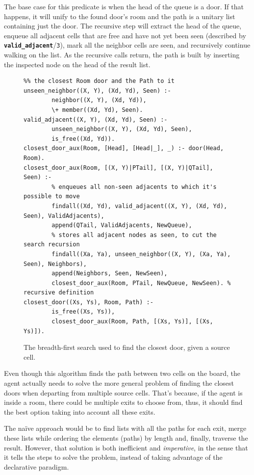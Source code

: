 \documentclass[12pt,a4paper]{article}
\newcommand{\varname}[1]{\texttt{#1}}
\newcommand{\varnamebf}[1]{\textbf{\texttt{#1}}}
\newcommand{\predprot}[2]{{\color{MidnightBlue}\varnamebf{#1}}/{\color{Mulberry}\varname{#2}}}
\begin{document}
The base case for this predicate is when the head of the queue is a door. If that happens, it will unify to the found door's room and the path is a unitary list containing just the door. The recursive step will extract the head of the queue, enqueue all adjacent cells that are free and have not yet been seen (described by \predprot{valid\_adjacent}{3}), mark all the neighbor cells are seen, and recursively continue walking on the list. As the recursive calls return, the path is built by inserting the inspected node on the head of the result list.

\begin{figure}[H]
	\centering
\begin{lstlisting}[style=Prolog-pygsty]
%% closest_door((Xs, Ys), Room, Path) - starting at <Xs, Ys>, finds
%% the closest Room door and the Path to it
unseen_neighbor((X, Y), (Xd, Yd), Seen) :-
		neighbor((X, Y), (Xd, Yd)),
		\+ member((Xd, Yd), Seen).
valid_adjacent((X, Y), (Xd, Yd), Seen) :-
		unseen_neighbor((X, Y), (Xd, Yd), Seen),
		is_free((Xd, Yd)).
closest_door_aux(Room, [Head], [Head|_], _) :- door(Head, Room).
closest_door_aux(Room, [(X, Y)|PTail], [(X, Y)|QTail], Seen) :-
		% enqueues all non-seen adjacents to which it's possible to move
		findall((Xd, Yd), valid_adjacent((X, Y), (Xd, Yd), Seen), ValidAdjacents),
		append(QTail, ValidAdjacents, NewQueue),
		% stores all adjacent nodes as seen, to cut the search recursion
		findall((Xa, Ya), unseen_neighbor((X, Y), (Xa, Ya), Seen), Neighbors),
		append(Neighbors, Seen, NewSeen),
		closest_door_aux(Room, PTail, NewQueue, NewSeen). % recursive definition
closest_door((Xs, Ys), Room, Path) :-
		is_free((Xs, Ys)),
		closest_door_aux(Room, Path, [(Xs, Ys)], [(Xs, Ys)]).
\end{lstlisting}
	\caption{The breadth-first search used to find the closest door, given a source cell.} 
	\label{fig:bfs}
\end{figure}

Even though this algorithm finds the path between two cells on the board, the agent actually needs to solve the more general problem of finding the closest doors when departing from multiple source cells. That's because, if the agent is inside a room, there could be multiple exits to choose from, thus, it should find the best option taking into account all these exits.

The na\"{i}ve approach would be to find lists with all the paths for each exit, merge these lists while ordering the elements (paths) by length and, finally, traverse the result. However, that solution is both inefficient and \textit{imperative}, in the sense that it tells the steps to solve the problem, instead of taking advantage of the declarative paradigm.
\end{document}
